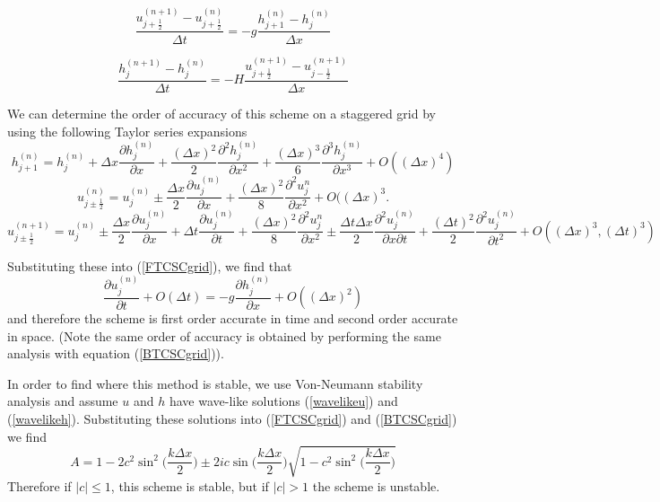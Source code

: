\documentclass[a4paper,12pt, notitlepage]{article}
\begin{document}
\begin{equation}\label{FTCSCgrid}
\frac{u_{j+ \frac{1}{2}}^{(n+1)} - u_{j + \frac{1}{2}}^{(n)}}{\Delta t} = -g \frac{h_{j+1}^{(n)} - h_{j}^{(n)}}{\Delta x}
\end{equation}

\begin{equation}\label{BTCSCgrid}
\frac{h_{j}^{(n+1)} - h_{j}^{(n)}}{\Delta t} = -H \frac{u_{j+\frac{1}{2}}^{(n+1)} - u_{j-\frac{1}{2}}^{(n+1)}}{\Delta x}
\end{equation}


We can determine the order of accuracy of this scheme on a staggered grid by using the following Taylor series expansions 
\begin{equation}
h_{j + 1}^{(n)} = h_{j}^{(n)} + \Delta x  \frac{\partial h_{j}^{(n)}}{\partial x} + \frac{(\Delta x)^{2}}{2}\frac{\partial^{2} h_{j}^{(n)}}{\partial x^{2}} + \frac{(\Delta x)^{3}}{6}\frac{\partial^{3} h_{j}^{(n)}}{\partial x^{3}} + O((\Delta x)^{4})
\end{equation}
\begin{equation} \label{uj+1/2n}
u_{j \pm \frac{1}{2}}^{(n)} = u_{j}^{(n)} \pm \frac{\Delta x}{2}\frac{\partial u_{j}^{(n)}}{\partial x} + \frac{(\Delta x)^{2}}{8}\frac{\partial^{2}u_{j}^{n}}{\partial x^{2}} + O({(\Delta x)^{3}}.
\end{equation}
\begin{equation} \label{uj+1/2n+1}
u_{j \pm \frac{1}{2}}^{(n + 1)} = u_{j}^{(n)} \pm \frac{\Delta x}{2}\frac{\partial u_{j}^{(n)}}{\partial x} + \Delta t \frac{\partial u_{j}^{(n)}}{\partial t} + \frac{(\Delta x)^{2}}{8}\frac{\partial^{2}u_{j}^{n}}{\partial x^{2}} \pm \frac{\Delta t \Delta x}{2}\frac{\partial^{2} u_{j}^{(n)}}{\partial x \partial t} + \frac{(\Delta t)^{2}}{2} \frac{\partial ^{2} u_{j}^{(n)}}{\partial t ^{2}} + O((\Delta x)^{3}, (\Delta t)^{3})
\end{equation}

Substituting these into (\ref{FTCSCgrid}), we find that 
\begin{equation}
\frac{\partial u_{j}^{(n)}}{\partial t} + O(\Delta t) =  -g \frac{\partial h_{j}^{(n)}}{\partial x} + O((\Delta x)^{2})
\end{equation} 
and therefore the scheme is first order accurate in time and second order accurate in space. (Note the same order of accuracy is obtained by performing the same analysis with equation (\ref{BTCSCgrid})).

In order to find where this method is stable, we use Von-Neumann stability analysis and assume $u$ and $h$ have wave-like solutions (\ref{wavelikeu}) and (\ref{wavelikeh}). Substituting these solutions into (\ref{FTCSCgrid}) and (\ref{BTCSCgrid}) we find
\begin{equation}
A = 1 - 2c^{2}\sin^{2}\bigg(\frac{k\Delta x}{2}\bigg) \pm 2ic\sin\bigg(\frac{k\Delta x}{2}\bigg) \sqrt{1 - c^{2}\sin^{2}(\frac{k\Delta x}{2}\bigg)}
\end{equation}
Therefore if $\lvert c \rvert \leq 1$, this scheme is stable, but if $\lvert c \rvert > 1$ the scheme is unstable.
\end{document}
